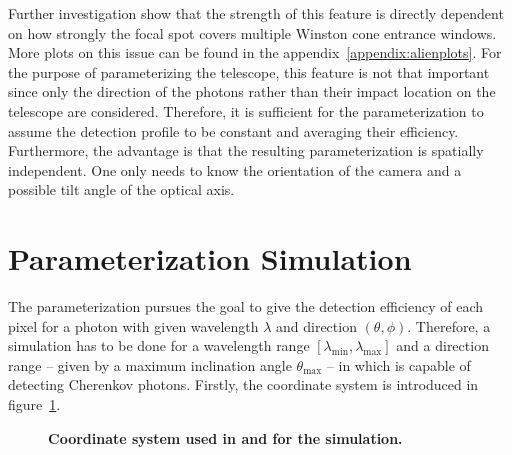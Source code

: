 Further investigation show that the strength of this feature is directly dependent on how strongly the focal spot covers multiple Winston cone entrance windows. More plots on this issue can be found in the appendix~\ref{appendix:alienplots}.
For the purpose of parameterizing the \iceact telescope, this feature is not that important since only the direction of the photons rather than their impact location on the telescope are considered. Therefore, it is sufficient for the parameterization to assume the detection profile to be constant and averaging their efficiency. Furthermore, the advantage is that the resulting parameterization is spatially independent. One only needs to know the orientation of the camera and a possible tilt angle of the optical axis.

\section{Parameterization Simulation}

The parameterization pursues the goal to give the detection efficiency of each pixel for a photon with given wavelength $\lambda$ and direction $(\theta,\phi)$. Therefore, a simulation has to be done for a wavelength range $[\lambda_\text{min}, \lambda_\text{max}]$ and a direction range -- given by a maximum inclination angle $\theta_\text{max}$ -- in which \iceact is capable of detecting Cherenkov photons. Firstly, the \geant coordinate system is introduced in figure~\ref{geant_coords}.\\

\begin{figure}[H]
	\centering
	\begin{subfigure}[t]{0.49\textwidth}
	\end{subfigure}
	\hfill
	\begin{subfigure}[t]{0.49\textwidth}
		\usebox{\savedimage}
	\end{subfigure}
	\caption[Coordinate system used in \geant and for the simulation]{\textbf{Coordinate system used in \geant and for the simulation.} }
	\label{geant_coords}
\end{figure}


